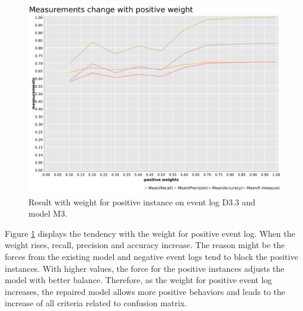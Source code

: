 \begin{figure}[htb]
	\includegraphics[width=\linewidth]{figures/evaluation/M3-D43-pos-weight-plot.pdf}
	\caption[Result tendency with weight for positive instances]{Result with weight for positive instance on event log D3.3 and model M3.}
	\label{fig:pos-weight}
\end{figure}
Figure \ref{fig:pos-weight} displays the tendency with the weight for positive event log. When the weight rises, recall, precision and accuracy increase. The reason might be the forces from the existing model and negative event logs tend to block the positive instances. With higher values, the force for the positive instances adjusts the model with better balance. Therefore, as the weight for positive event log increases, the repaired model allows more positive behaviors  and leads to the increase of all criteria related to confusion matrix.

